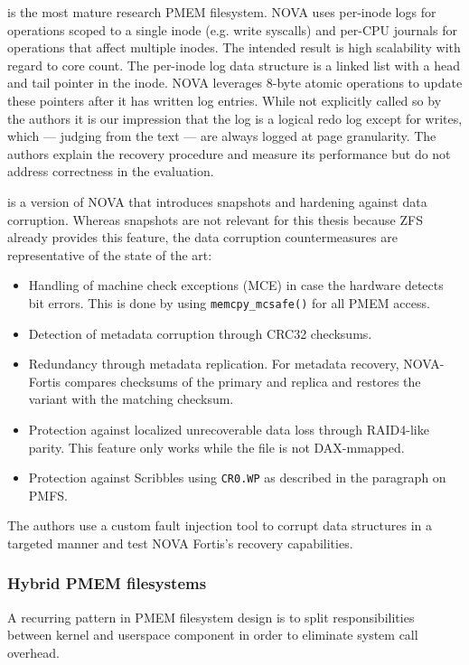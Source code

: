 \documentclass[12pt,a4paper,twoside]{book}
\begin{document}
 is the most mature research PMEM filesystem.
NOVA uses per-inode logs for operations scoped to a single inode (e.g. write syscalls) and per-CPU journals for operations that affect multiple inodes.
The intended result is high scalability with regard to core count.
The per-inode log data structure is a linked list with a head and tail pointer in the inode.
NOVA leverages 8-byte atomic operations to update these pointers after it has written log entries.
While not explicitly called so by the authors it is our impression that the log is a logical redo log except for writes, which --- judging from the text --- are always logged at page granularity.
The authors explain the recovery procedure and measure its performance but do not address correctness in the evaluation.

 is a version of NOVA that introduces snapshots and hardening against data corruption.
Whereas snapshots are not relevant for this thesis because ZFS already provides this feature, the data corruption countermeasures are representative of the state of the art:
\begin{itemize}[noitemsep,beginpenalty=100000,midpenalty=100000]
    \item Handling of machine check exceptions (MCE) in case the hardware detects bit errors.
          This is done by using \lstinline{memcpy_mcsafe()} for all PMEM access.
    \item Detection of metadata corruption through CRC32 checksums.
    \item Redundancy through metadata replication. For metadata recovery, NOVA-Fortis compares checksums of the primary and replica and restores the variant with the matching checksum.
    \item Protection against localized unrecoverable data loss through RAID4-like parity.
          This feature only works while the file is not DAX-mmapped.
    \item Protection against Scribbles using \lstinline{CR0.WP} as described in the paragraph on PMFS.
\end{itemize}
The authors use a custom fault injection tool to corrupt data structures in a targeted manner and test NOVA Fortis's recovery capabilities.

\subsubsection{Hybrid PMEM filesystems}\label{sec:hybrid_pmem_file_systems}
A recurring pattern in PMEM filesystem design is to split responsibilities between kernel and userspace component in order to eliminate system call overhead.
\end{document}
